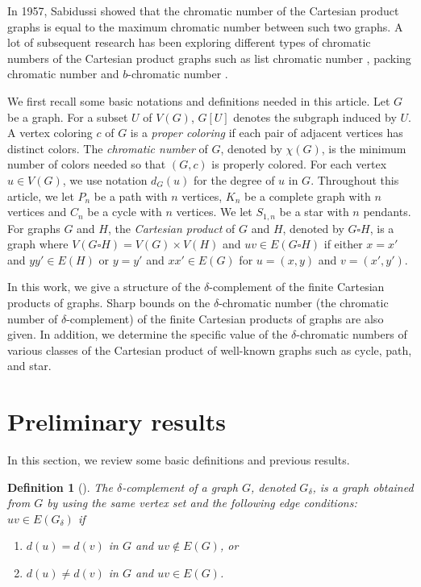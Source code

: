 \documentclass[12pt]{amsart}
\newtheorem{definition}[theorem]{Definition}
\begin{document}
In 1957, Sabidussi \cite{sabidussi_1957} showed that the chromatic number of the Cartesian product graphs is equal to the maximum chromatic number between such two graphs.
A lot of subsequent research has been exploring different types of chromatic numbers of the Cartesian product graphs such as list chromatic number \cite{BOROWIECKI20061955}, packing chromatic number \cite{BRESAR20072303} and $b$-chromatic number \cite{Balakrishnan2014,GUO201882}.

We first recall some basic notations and definitions needed in this article. 
Let $G$ be a graph.
For a subset $U$ of $V(G)$, $G[U]$ denotes the subgraph induced by $U$. 
A vertex coloring $c$ of $G$ is a \textit{proper coloring} if each pair of adjacent vertices has distinct colors.
The \textit{chromatic number} of $G$, denoted by $\chi(G)$, is the minimum number of colors needed so that $(G,c)$ is properly colored.
For each vertex $u\in V(G)$, we use notation $d_G(u)$ for the degree of $u$ in $G$.
Throughout this article, we let $P_n$ be a path with $n$ vertices, $K_n$ be a complete graph with $n$ vertices and $C_n$ be a cycle with $n$ vertices.
We let $S_{1,n}$ be a star with $n$ pendants.
For graphs $G$ and $H$, the \textit{Cartesian product} of $G$ and $H$, denoted by $G\square H$, is a graph where $V(G\square H)=V(G)\times V(H)$ and $uv\in E(G\square H)$ if either $x=x'$ and $yy'\in E(H)$ or $y=y'$ and $xx'\in E(G)$ for $u=(x,y)$ and $v=(x',y')$.

In this work, we give a structure of the $\delta$-complement of the finite Cartesian products of graphs.
Sharp bounds on the $\delta$-chromatic number (the chromatic number of $\delta$-complement) of the finite Cartesian products of graphs are also given.
In addition, we determine the specific value of the $\delta$-chromatic numbers of various classes of the Cartesian product of well-known graphs such as cycle, path, and star.

\section{Preliminary results}
In this section, we review some basic definitions and previous results.

\begin{definition}[\cite{math10081203}] \normalfont 
The \textit{$\delta$-complement} of a graph $G$, denoted $G_\delta$, is a graph obtained from $G$ by using the same vertex set and the following edge conditions: $uv\in E(G_\delta)$ if
\begin{enumerate}
    \item  $d(u)=d(v)$ in $G$ and $uv\notin E(G)$, or
    \item $d(u)\neq d(v)$ in $G$ and $uv\in E(G)$.
\end{enumerate}
\end{definition}
\end{document}

